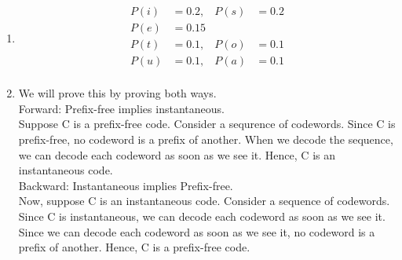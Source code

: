\documentclass[a4paper]{article}
\begin{document}
\begin{enumerate}
(d) Encoding $baaaacbadaafaaae$ to X:

Also, since no code is a prefix of another code, the code is uniquely decodable.

(e) FSM:

\item \begin{align*}
    P(i) & = 0.2, & P(s) & = 0.2 \\
    P(e) & = 0.15 \\
    P(t) & = 0.1, & P(o) & = 0.1 \\
    P(u) & = 0.1, & P(a) & = 0.1 \\
    \end{align*}

\item We will prove this by proving both ways.\\

Forward: Prefix-free implies instantaneous.\\
Suppose C is a prefix-free code. Consider a sequrence of codewords. Since C is prefix-free, no codeword is a prefix of another. When we decode the sequence, we can decode each codeword as soon as we see it. Hence, C is an instantaneous code.\\

Backward: Instantaneous implies Prefix-free.\\
Now, suppose C is an instantaneous code. Consider a sequence of codewords. Since C is instantaneous, we can decode each codeword as soon as we see it. Since we can decode each codeword as soon as we see it, no codeword is a prefix of another. Hence, C is a prefix-free code.\\


\end{enumerate}
\end{document}
